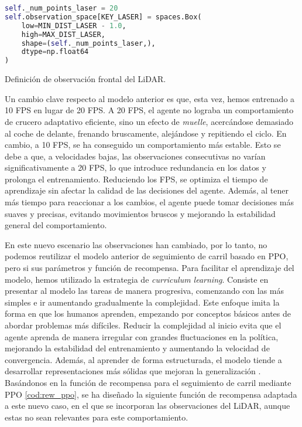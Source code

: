 \begin{code}[h]
\begin{lstlisting}[language=Python]
self._num_points_laser = 20
self.observation_space[KEY_LASER] = spaces.Box(
	low=MIN_DIST_LASER - 1.0,
	high=MAX_DIST_LASER,
	shape=(self._num_points_laser,),
	dtype=np.float64
)
\end{lstlisting}
\caption[Definición de observación frontal del \ac{LiDAR}]{Definición de observación frontal del \ac{LiDAR}.}
\label{cod:obs_laser_front}
\end{code}

Un cambio clave respecto al modelo anterior es que, esta vez, hemos entrenado a 10 \ac{FPS} en lugar de 20 \ac{FPS}. A 20 \ac{FPS}, el agente no lograba un comportamiento de crucero adaptativo eficiente, sino un efecto de \textit{muelle}, acercándose demasiado al coche de delante, frenando bruscamente, alejándose y repitiendo el ciclo. En cambio, a 10 \ac{FPS}, se ha conseguido un comportamiento más estable. Esto se debe a que, a velocidades bajas, las observaciones consecutivas no varían significativamente a 20 \ac{FPS}, lo que introduce redundancia en los datos y prolonga el entrenamiento. Reduciendo los \ac{FPS}, se optimiza el tiempo de aprendizaje sin afectar la calidad de las decisiones del agente. Además, al tener más tiempo para reaccionar a los cambios, el agente puede tomar decisiones más suaves y precisas, evitando movimientos bruscos y mejorando la estabilidad general del comportamiento.

En este nuevo escenario las observaciones han cambiado, por lo tanto, no podemos reutilizar el modelo anterior de seguimiento de carril basado en \ac{PPO}, pero si sus parámetros y función de recompensa. Para facilitar el aprendizaje del modelo, hemos utilizado la estrategia de \textit{curriculum learning}. Consiste en presentar al modelo las tareas de manera progresiva, comenzando con las más simples e ir aumentando gradualmente la complejidad. Este enfoque imita la forma en que los humanos aprenden, empezando por conceptos básicos antes de abordar problemas más difíciles. Reducir la complejidad al inicio evita que el agente aprenda de manera irregular con grandes fluctuaciones en la política, mejorando la estabilidad del entrenamiento y aumentando la velocidad de convergencia. Además, al aprender de forma estructurada, el modelo tiende a desarrollar representaciones más sólidas que mejoran la generalización \cite{curriculum-learning}. Basándonos en la función de recompensa para el seguimiento de carril mediante \ac{PPO} \ref{cod:rew_ppo}, se ha diseñado la siguiente función de recompensa adaptada a este nuevo caso, en el que se incorporan las observaciones del \ac{LiDAR}, aunque estas no sean relevantes para este comportamiento.

